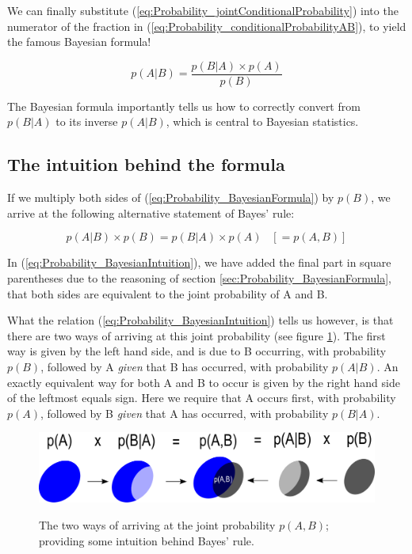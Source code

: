 \documentclass[11pt,fullpage]{book}
\begin{document}
We can finally substitute (\ref{eq:Probability_jointConditionalProbability}) into the numerator of the fraction in (\ref{eq:Probability_conditionalProbabilityAB}), to yield the famous Bayesian formula!

\begin{equation}\label{eq:Probability_BayesianFormula}
p(A|B) = \frac{p(B|A)\times p(A)}{p(B)}
\end{equation}

The Bayesian formula importantly tells us how to correctly convert from $p(B|A)$ to its inverse $p(A|B)$, which is central to Bayesian statistics.

\subsection{The intuition behind the formula}
If we multiply both sides of (\ref{eq:Probability_BayesianFormula}) by $p(B)$, we arrive at the following alternative statement of Bayes' rule:

\begin{equation}\label{eq:Probability_BayesianIntuition}
p(A|B)\times p(B) = p(B|A)\times p(A) \;\;\;[= p(A,B)]
\end{equation}

In (\ref{eq:Probability_BayesianIntuition}), we have added the final part in square parentheses due to the reasoning of section \ref{sec:Probability_BayesianFormula}, that both sides are equivalent to the joint probability of A and B.

What the relation (\ref{eq:Probability_BayesianIntuition}) tells us however, is that there are two ways of arriving at this joint probability (see figure \ref{fig:Probability_BayesianIntuition}). The first way is given by the left hand side, and is due to B occurring, with probability $p(B)$, followed by A \textit{given} that B has occurred, with probability $p(A|B)$. An exactly equivalent way for both A and B to occur is given by the right hand side of the leftmost equals sign. Here we require that A occurs first, with probability $p(A)$, followed by B \textit{given} that A has occurred, with probability $p(B|A)$.

\begin{figure}
\centering
\scalebox{0.4} 
{\includegraphics{Probability_BayesianIntuition.pdf}}
\caption{The two ways of arriving at the joint probability $p(A,B)$; providing some intuition behind Bayes' rule.}\label{fig:Probability_BayesianIntuition}
\end{figure}
\end{document}
